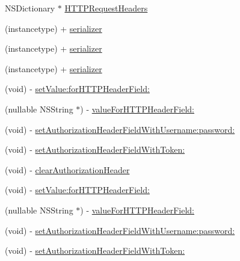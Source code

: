  \begin{DoxyCompactItemize}
\item 
N\+S\+Dictionary $\ast$ \mbox{\hyperlink{interface_a_f_h_t_t_p_request_serializer_a8ea98a933795e97a771f4b5a82a637c2}{H\+T\+T\+P\+Request\+Headers}}
\item 
(instancetype) + \mbox{\hyperlink{interface_a_f_h_t_t_p_request_serializer_acfa41b7617090479b4ad92edcf8451d7}{serializer}}
\item 
(instancetype) + \mbox{\hyperlink{interface_a_f_h_t_t_p_request_serializer_acfa41b7617090479b4ad92edcf8451d7}{serializer}}
\item 
(instancetype) + \mbox{\hyperlink{interface_a_f_h_t_t_p_request_serializer_acfa41b7617090479b4ad92edcf8451d7}{serializer}}
\item 
(void) -\/ \mbox{\hyperlink{interface_a_f_h_t_t_p_request_serializer_a782d460accdab9c8682550a77f167898}{set\+Value\+:for\+H\+T\+T\+P\+Header\+Field\+:}}
\item 
(nullable N\+S\+String $\ast$) -\/ \mbox{\hyperlink{interface_a_f_h_t_t_p_request_serializer_ad3772ba3e52f7d71a2a08f2b3c113721}{value\+For\+H\+T\+T\+P\+Header\+Field\+:}}
\item 
(void) -\/ \mbox{\hyperlink{interface_a_f_h_t_t_p_request_serializer_a67c09b048eff53d3e9cad39a954d5676}{set\+Authorization\+Header\+Field\+With\+Username\+:password\+:}}
\item 
(void) -\/ \mbox{\hyperlink{interface_a_f_h_t_t_p_request_serializer_aa7426bb8422c203a0aeb17f8c04ff8e6}{set\+Authorization\+Header\+Field\+With\+Token\+:}}
\item 
(void) -\/ \mbox{\hyperlink{interface_a_f_h_t_t_p_request_serializer_a211e5d5ca44cd3f2fe0e1f1deeb9ef17}{clear\+Authorization\+Header}}
\item 
(void) -\/ \mbox{\hyperlink{interface_a_f_h_t_t_p_request_serializer_a782d460accdab9c8682550a77f167898}{set\+Value\+:for\+H\+T\+T\+P\+Header\+Field\+:}}
\item 
(nullable N\+S\+String $\ast$) -\/ \mbox{\hyperlink{interface_a_f_h_t_t_p_request_serializer_a11dac7e7ab325f1e937c717f8c4e25b4}{value\+For\+H\+T\+T\+P\+Header\+Field\+:}}
\item 
(void) -\/ \mbox{\hyperlink{interface_a_f_h_t_t_p_request_serializer_a67c09b048eff53d3e9cad39a954d5676}{set\+Authorization\+Header\+Field\+With\+Username\+:password\+:}}
\item 
(void) -\/ \mbox{\hyperlink{interface_a_f_h_t_t_p_request_serializer_aa7426bb8422c203a0aeb17f8c04ff8e6}{set\+Authorization\+Header\+Field\+With\+Token\+:}}

\end{DoxyCompactItemize}
